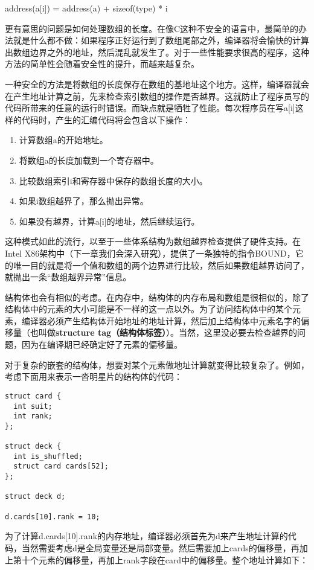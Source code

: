 \documentclass[cn,11pt,chinese]{elegantbook}
\begin{document}
address(a[i]) = address(a) + sizeof(type) * i

更有意思的问题是如何处理数组的长度。在像C这种不安全的语言中，最简单的办法就是什么都不做：如果程序正好运行到了数组尾部之外，编译器将会愉快的计算出数组边界之外的地址，然后混乱就发生了。对于一些性能要求很高的程序，这种方法的简单性会随着安全性的提升，而越来越复杂。

一种安全的方法是将数组的长度保存在数组的基地址这个地方。这样，编译器就会在产生地址计算之前，先来检查索引数组的操作是否越界。这就防止了程序员写的代码所带来的任意的运行时错误。而缺点就是牺牲了性能。每次程序员在写a[i]这样的代码时，产生的汇编代码将会包含以下操作：

\begin{enumerate}
  \item 计算数组a的开始地址。
  \item 将数组a的长度加载到一个寄存器中。
  \item 比较数组索引i和寄存器中保存的数组长度的大小。
  \item 如果i数组越界了，那么抛出异常。
  \item 如果没有越界，计算a[i]的地址，然后继续运行。
\end{enumerate}

这种模式如此的流行，以至于一些体系结构为数组越界检查提供了硬件支持。在Intel X86架构中（下一章我们会深入研究），提供了一条独特的指令BOUND，它的唯一目的就是将一个值和数组的两个边界进行比较，然后如果数组越界访问了，就抛出一条“数组越界异常”信息。

结构体也会有相似的考虑。在内存中，结构体的内存布局和数组是很相似的，除了结构体中的元素的大小可能是不一样的这一点以外。为了访问结构体中的某个元素，编译器必须产生结构体开始地址的地址计算，然后加上结构体中元素名字的偏移量（也叫做\textbf{structure tag（结构体标签）}）。当然，这里没必要去检查越界的问题，因为在编译期已经确定好了元素的偏移量。

对于复杂的嵌套的结构体，想要对某个元素做地址计算就变得比较复杂了。例如，考虑下面用来表示一沓明星片的结构体的代码：

\begin{verbatim}
struct card {
  int suit;
  int rank;
};

struct deck {
  int is_shuffled;
  struct card cards[52];
};

struct deck d;

d.cards[10].rank = 10;
\end{verbatim}

为了计算d.cards[10].rank的内存地址，编译器必须首先为d来产生地址计算的代码，当然需要考虑d是全局变量还是局部变量。然后需要加上cards的偏移量，再加上第十个元素的偏移量，再加上rank字段在card中的偏移量。整个地址计算如下：
\end{document}
